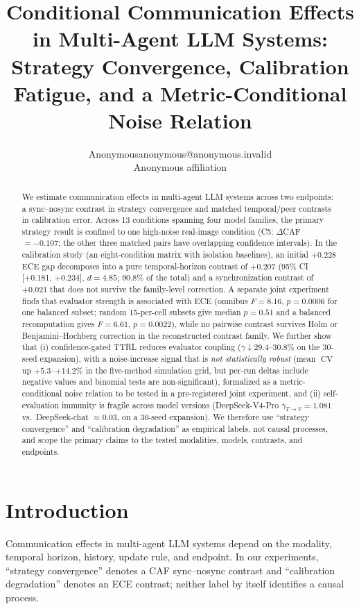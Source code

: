 \documentclass[11pt]{article}
\title{Conditional Communication Effects in Multi-Agent LLM Systems: Strategy Convergence, Calibration Fatigue, and a Metric-Conditional Noise Relation}
\author{\name Anonymous\email anonymous@anonymous.invalid\\\addr Anonymous affiliation}
\date{}
\DeclareMathOperator{\CV}{CV}
\begin{document}
\maketitle

\begin{abstract}
We estimate communication effects in multi-agent LLM systems across two endpoints: a sync--nosync contrast in strategy convergence and matched temporal/peer contrasts in calibration error. Across 13 conditions spanning four model families, the primary strategy result is confined to one high-noise real-image condition (C5: $\Delta$CAF $=-0.107$; the other three matched pairs have overlapping confidence intervals). In the calibration study (an eight-condition matrix with isolation baselines), an initial $+0.228$ ECE gap decomposes into a pure temporal-horizon contrast of $+0.207$ (95\% CI [+0.181, +0.234], $d{=}4.85$; 90.8\% of the total) and a synchronization contrast of $+0.021$ that does not survive the family-level correction. A separate joint experiment finds that evaluator strength is associated with ECE (omnibus $F{=}8.16$, $p{=}0.0006$ for one balanced subset; random 15-per-cell subsets give median $p{=}0.51$ and a balanced recomputation gives $F{=}6.61$, $p{=}0.0022$), while no pairwise contrast survives Holm or Benjamini--Hochberg correction in the reconstructed contrast family. We further show that (i) confidence-gated TTRL reduces evaluator coupling ($\gamma \downarrow 29.4$--$30.8\%$ on the 30-seed expansion), with a noise-increase signal that is \emph{not statistically robust} (mean $\CV$ up $+5.3$--$+14.2\%$ in the five-method simulation grid, but per-run deltas include negative values and binomial tests are non-significant), formalized as a metric-conditional noise relation to be tested in a pre-registered joint experiment, and (ii) self-evaluation immunity is fragile across model versions (DeepSeek-V4-Pro $\gamma_{T\to V}{=}1.081$ vs.\ DeepSeek-chat $\approx 0.03$, on a 30-seed expansion). We therefore use ``strategy convergence'' and ``calibration degradation'' as empirical labels, not causal processes, and scope the primary claims to the tested modalities, models, contrasts, and endpoints.
\end{abstract}

\section{Introduction}

Communication effects in multi-agent LLM systems depend on the modality, temporal horizon, history, update rule, and endpoint. In our experiments, ``strategy convergence'' denotes a CAF sync--nosync contrast and ``calibration degradation'' denotes an ECE contrast; neither label by itself identifies a causal process.
\end{document}
